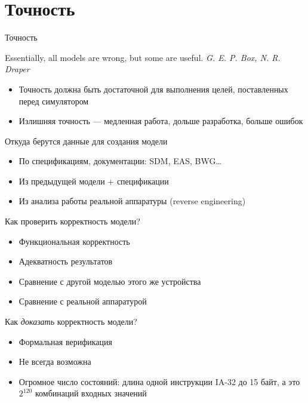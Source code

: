 \section{Точность}

\begin{frame}{Точность}

\begin{flushright}
\tiny{Essentially, all models are wrong, but some are useful. \textit{G. E. P. Box, N. R. Draper}}
\end{flushright}

\begin{itemize}
\item Точность должна быть достаточной для выполнения целей, поставленных перед симулятором
\item Излишняя точность — медленная работа, дольше разработка, больше ошибок
\end{itemize}

\end{frame}

\begin{frame}{Откуда берутся данные для создания модели}

\begin{itemize}
\item По спецификациям, документации: SDM, EAS, BWG\dots
\item Из предыдущей модели + спецификации
\item Из анализа работы реальной аппаратуры (reverse engineering)
\end{itemize}

\end{frame}

\begin{frame}{Как проверить корректность модели?}

\begin{itemize}
\item Функциональная корректность
\item Адекватность результатов
\item Сравнение с другой моделью этого же устройства
\item Сравнение с реальной аппаратурой
\end{itemize}
\end{frame}

\begin{frame}{Как \textit{доказать} корректность модели?}

\begin{itemize}
\item Формальная верификация
\item Не всегда возможна
\item Огромное число состояний: длина одной инструкции IA-32 до 15 байт, а это $2^{120}$ комбинаций входных значений
\end{itemize}
\end{frame}

